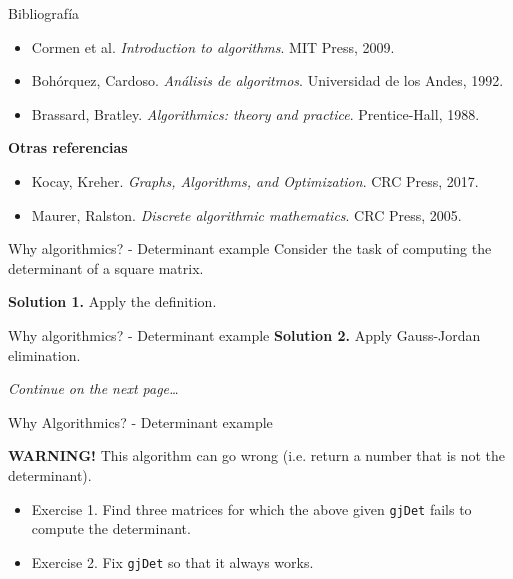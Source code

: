 \documentclass{beamer}
\begin{document}
%

\begin{frame}{Bibliografía}
\begin{itemize}
    \item Cormen et al. \textit{Introduction to algorithms}. MIT Press, 2009.
    \item Bohórquez, Cardoso. \textit{Análisis de algoritmos}. Universidad de los Andes, 1992. \pause
    \item Brassard, Bratley. \textit{Algorithmics: theory and practice}. Prentice-Hall, 1988. \pause \smiley\smiley
\end{itemize}\pause

\bigskip

\textbf{Otras referencias}

\begin{itemize}
    \item Kocay, Kreher. \textit{Graphs, Algorithms, and Optimization}. CRC Press, 2017.
    \item Maurer, Ralston. \textit{Discrete algorithmic mathematics}. CRC Press, 2005.
\end{itemize}
\end{frame}

%

\begin{frame}{Why algorithmics? - Determinant example}
	Consider the task of computing the determinant of a square matrix.

	\textbf{Solution 1.} Apply the definition.

	
\end{frame}

%

\begin{frame}{Why algorithmics? - Determinant example}
	\textbf{Solution 2.} Apply Gauss-Jordan elimination.

	

	\textit{Continue on the next page\ldots}
\end{frame}

%

\begin{frame}{Why Algorithmics? - Determinant example}
	

	\textbf{WARNING!} This algorithm can go wrong (i.e. return a number that is
	not the determinant).
	\begin{itemize}
		\item Exercise 1. Find three matrices for which the above given \texttt{gjDet}
			fails to compute the determinant.
		\item Exercise 2. Fix \texttt{gjDet} so that it always works.
	\end{itemize}
\end{frame}
\end{document}
